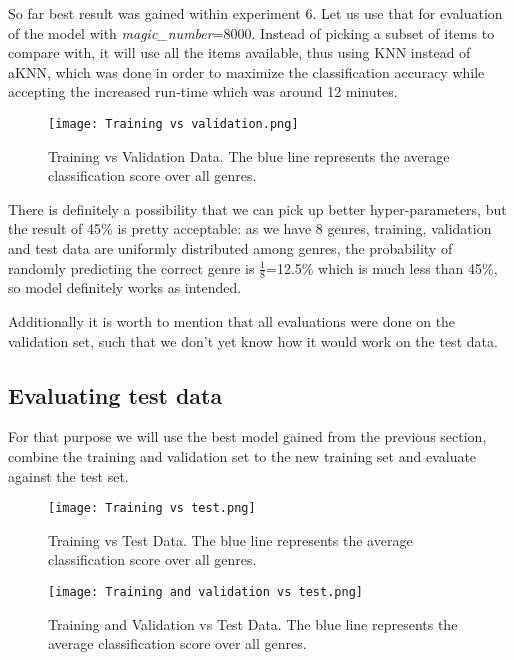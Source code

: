 \documentclass[11pt]{article}
\begin{document}
\newpage
So far best result was gained within experiment 6. Let us use that for evaluation of the model with \textit{magic\_number}=8000. Instead of picking a subset of items to compare with, it will use all the items available, thus using KNN instead of aKNN, which was done in order to maximize the classification accuracy while accepting the increased run-time which was around 12 minutes. 

\begin{figure}[ht]
    \begin{centering}
        \texttt{[image: Training vs validation.png]}
 	    \caption{Training vs Validation Data. The blue line represents the average classification score over all genres.}
 	    {\small  }
        \label{Fig:1}  
    \end{centering}
\end{figure}

There is definitely a possibility that we can pick up better hyper-parameters, but the result of 45\% is pretty acceptable: as we have 8 genres, training, validation and test data are uniformly distributed among genres, the probability of randomly predicting the correct genre is $\frac{1}{8}$=12.5\% which is much less than 45\%, so model definitely works as intended.

Additionally it is worth to mention that all evaluations were done on the  validation set, such that we don't yet know how it would work on the test data.

\subsection*{Evaluating test data}

For that purpose we will use the best model gained from the previous section, combine the training and validation set to the new training set and evaluate against the test set.

\begin{figure}[ht]
    \begin{centering}
        \texttt{[image: Training vs test.png]}
 	    \caption{Training vs Test Data. The blue line represents the average classification score over all genres.}
 	    {\small  }
        \label{Fig:2}  
    \end{centering}
\end{figure}

\begin{figure}[ht]
    \begin{centering}
        \texttt{[image: Training and validation vs test.png]}
 	    \caption{Training and Validation vs Test Data. The blue line represents the average classification score over all genres.}
 	    {\small  }
        \label{Fig:3}  
    \end{centering}
\end{figure}
\clearpage
\end{document}
